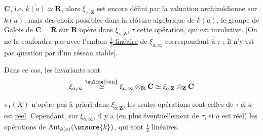 $\mathbf C$, i.e. $\overline{k(a)}\simeq\mathbf R$,  alors $\xi_{x,\mathbf Z}$ est encore défini par la valuation archimédienne sur $k(a)$, mais   des choix possibles dans la clôture algébrique de $k(a)$, le groupe de Galois de $\mathbf C=\overline{\mathbf R}$ sur $\mathbf R$ opère dans $\xi_{x,\mathbf Z}$,  $\tau$ \uline{cette opération}, qui est involutive.  [On ne la confondra pas avec l'endom \uline{$\frac12$ linéaire} de $\xi_{\bar a,\infty}$ correspondant à $\tau$ ; il n'y est pas question par  d'un réseau stable].


Dans ce cas, les invariants sont
\[
\xi_{\bar a,\infty}\overset{\text{\uuline{can}}}{\simeq}\xi_{a,\infty}\otimes_{\mathbf R}\mathbf C\simeq\xi_{\bar a,\mathbf Z}\otimes_{\mathbf Z}\mathbf C
\]

$\pi_1(X)$ n'opère pas à priori dans $\xi_{a,\mathbf Z}$, les seules opérations sont celles de $\tau$ si $a$ est \uline{réel}. Cependant, sur $\xi_{\bar a,\infty}$, il y a (en plus éventuellement de $\tau$, si $a$ est réel) les opérations de $\operatorname{Aut}_{k(a)}(\unsure{k})$, qui sont $\frac12$ linéaires.

